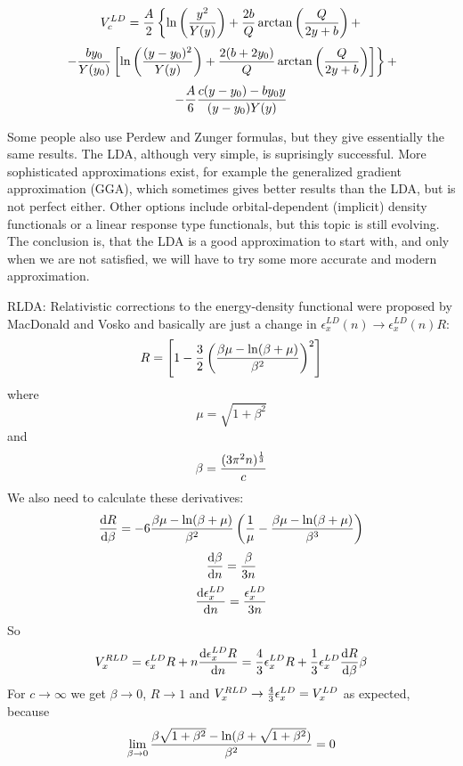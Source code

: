 \begin{equation*}
  V_c^{LD}={A\over2}\left\{ \ln\left(y^2\over Y(y)\right)+{2b\over Q}\arctan\left(Q\over 2y+b\right)+ \right.
\end{equation*}
\begin{equation*}
  \left. -{by_0\over Y(y_0)}\left[\ln\left((y-y_0)^2\over Y(y)\right) +{2(b+2y_0)\over Q}\arctan\left(Q\over 2y+b\right) \right] \right\}+
\end{equation*}
\begin{equation*}
  -{A\over6}{c(y-y_0)-by_0y\over (y-y_0)Y(y)}
\end{equation*}

Some people also use Perdew and Zunger formulas, but they give essentially the same results. The LDA, although very simple, is suprisingly successful. More sophisticated approximations exist, for example the generalized gradient approximation (GGA), which sometimes gives better results than the LDA, but is not perfect either. Other options include orbital-dependent (implicit) density functionals or a linear response type functionals, but this topic is still evolving. The conclusion is, that the LDA is a good approximation to start with, and only when we are not satisfied, we will have to try some more accurate and modern approximation.

RLDA: Relativistic corrections to the energy-density functional were proposed by MacDonald and Vosko and basically are just a change in $\epsilon_x^{LD}(n)\rightarrow\epsilon_x^{LD}(n)R$: 
\begin{equation*}
  R = \left[1-{3\over2}\left(\beta\mu-\ln(\beta+\mu)\over\beta^2\right)^2\right]
\end{equation*}
where 
\begin{equation*}
  \mu=\sqrt{1+\beta^2}
\end{equation*}
and 
\begin{equation*}
  \beta={(3\pi^2n)^{1\over3}\over c}
\end{equation*}
We also need to calculate these derivatives: 
\begin{equation*}
  {{\rm d}R\over{\rm d}\beta}= -6{\beta\mu-\ln(\beta+\mu)\over\beta^2}\left({1\over\mu}- {\beta\mu-\ln(\beta+\mu)\over\beta^3}\right)
\end{equation*}
\begin{equation*}
  {{\rm d}\beta\over{\rm d}n}={\beta\over 3n}
\end{equation*}
\begin{equation*}
  {{\rm d}\epsilon_x^{LD}\over{\rm d}n}={\epsilon_x^{LD}\over 3n}
\end{equation*}
So 
\begin{equation}
  V_x^{RLD}=\epsilon_x^{LD}R+n{{\rm d} \epsilon_x^{LD}R\over{\rm d} n}=
  {4\over3}\epsilon_x^{LD}R+{1\over3}\epsilon_x^{LD}{{\rm d} R\over{\rm d}\beta}\beta
  \label{RLDA}
\end{equation}
For $c\to\infty$ we get $\beta\to0$, $R\to1$ and $V_x^{RLD}\to {4\over3}\epsilon_x^{LD}=V_x^{LD}$ as expected, because 
\begin{equation*}
  \lim_{\beta\to0}{\beta\sqrt{1+\beta^2}-\ln(\beta+\sqrt{1+\beta^2})\over \beta^2} = 0
\end{equation*}

